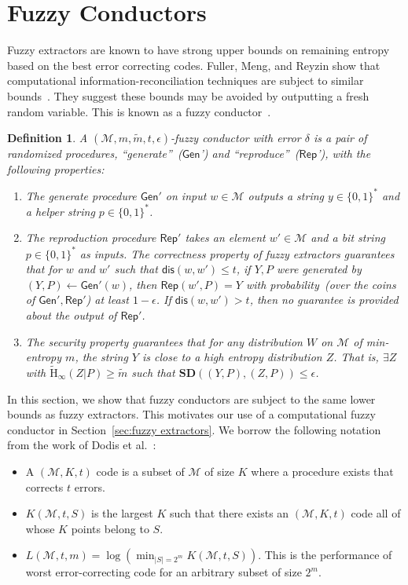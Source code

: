 \documentclass[11pt]{article}
\newcommand{\secref}[1]{\mbox{Section~\ref{#1}}}
\newcommand{\class}[1]{{\ensuremath{\mathsf{#1}}}}
\newcommand{\gen}{\ensuremath{\class{Gen}}\xspace}
\newcommand{\rep}{\ensuremath{\class{Rep}}\xspace}
\newcommand{\zo}{\ensuremath{\{0, 1\}}}
\newcommand{\dis}{\ensuremath{\mathsf{dis}}}
\newcommand{\Hav}{\tilde{\mathrm{H}}_\infty}
\newtheorem{definition}[theorem]{Definition}
\begin{document}
\section{Fuzzy Conductors}

\label{sec:conductors}
Fuzzy extractors are known to have strong upper bounds on remaining entropy based on the best error correcting codes.  Fuller, Meng, and Reyzin show that computational information-reconciliation techniques are subject to similar bounds~\cite{fuller2013computational}.  They suggest these bounds may be avoided by outputting a fresh random variable.  This is known as a fuzzy conductor~\cite{KanukurthiR09}.
\begin{definition}
A $(\mathcal{M}, m, \tilde{m}, t, \epsilon)$-\emph{fuzzy conductor} with error $\delta$ is a pair of randomized procedures, ``generate''~(\gen') and ``reproduce''~(\rep'), with the following properties:
\begin{enumerate}
\item The generate procedure $\gen'$ on input $w\in \mathcal{M}$ outputs a string $y\in\zo^*$ and a helper string $p\in\zo^*$.
\item The reproduction procedure $\rep'$ takes an element $w'\in\mathcal{M}$ and a bit string $p\in\zo^*$ as inputs.  The \emph{correctness} property of fuzzy extractors guarantees that for $w$ and $w'$ such that $\dis(w, w')\leq t$, if $Y, P$ were generated by $(Y, P)\leftarrow \gen'(w)$, then $\rep(w', P) = Y$ with probability~(over the coins of $\gen', \rep'$) at least $1-\epsilon$.  If $\dis(w, w')>t$, then no guarantee is provided about the output of $\rep'$.
\item The security property guarantees that for any distribution $W$ on $\mathcal{M}$ of min-entropy $m$, the string $Y$ is close to a high entropy distribution $Z$.  That is, $\exists Z$ with $\Hav(Z | P ) \geq \tilde{m}$ such that $\mathbf{SD}((Y, P), (Z, P))\leq \epsilon$.
\end{enumerate}
\end{definition}

\noindent In this section, we show that fuzzy conductors are subject to the same lower bounds as fuzzy extractors.  This motivates our use of a computational fuzzy conductor in \secref{sec:fuzzy extractors}. 
We borrow the following notation from the work of Dodis et al.~\cite{DBLP:journals/siamcomp/DodisORS08}:
\begin{itemize}
\item A $(\mathcal{M}, K, t)$ code is a subset of $\mathcal{M}$ of size $K$ where a procedure exists that corrects $t$ errors.
\item $K(\mathcal{M}, t, S)$ is the largest $K$ such that there exists an $(\mathcal{M}, K, t)$ code all of whose $K$ points belong to $S$.
\item $L(\mathcal{M}, t, m) = \log (\min_{|S| = 2^m} K(\mathcal{M}, t, S))$.  This is the performance of worst error-correcting code for an arbitrary subset of size $2^m$.
\end{itemize}
\end{document}
